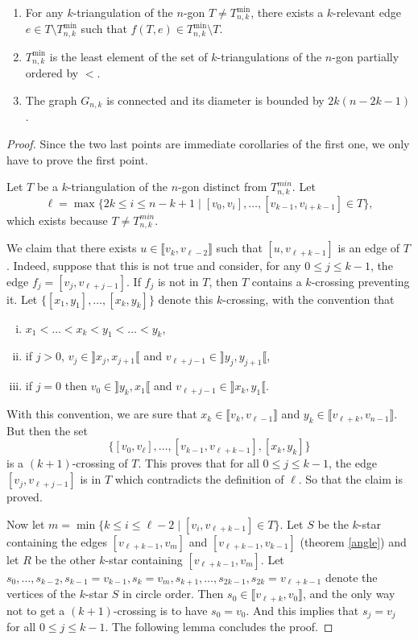 \documentclass[12pt]{amsart}
\begin{document}
\begin{proposition}\label{connexity}
\begin{enumerate}
\item For any $k$-triangulation of the $n$-gon $T\ne T_{n,k}^{\min}$, there exists a $k$-relevant edge $e\in T\setminus T_{n,k}^{\min}$ such that $f(T,e)\in T_{n,k}^{\min}\setminus T$.
\item $T_{n,k}^{\min}$ is the least element of the set of $k$-triangulations of the $n$-gon partially ordered by $<$.
\item The graph $G_{n,k}$ is connected and its diameter is bounded by $2k(n-2k-1)$.
\end{enumerate}
\end{proposition}

\begin{proof}
Since the two last points are immediate corollaries of the first one, we only have to prove the first point.

Let $T$ be a $k$-triangulation of the $n$-gon distinct from $T_{n,k}^{min}$. Let
$$\ell=\max\{2k\le i\le n-k+1\;|\;[v_0,v_i],\ldots,[v_{k-1},v_{i+k-1}]\in T\},$$
which exists because $T\ne T_{n,k}^{min}$.

We claim that there exists $u\in\llbracket v_k, v_{\ell-2}\rrbracket$ such that $[u,v_{\ell+k-1}]$ is an edge of $T$. Indeed, suppose that this is not true and consider, for any $0\le j\le k-1$, the edge $f_j=[v_j,v_{\ell+j-1}]$. If $f_j$ is not in $T$, then $T$ contains a $k$-crossing preventing it.
Let $\{[x_1,y_1],\ldots,[x_k,y_k]\}$ denote this $k$-crossing, with the convention that
\begin{enumerate}[(i)]
\item $x_1<\ldots<x_k<y_1<\ldots<y_k$,
\item if $j>0$, $v_j\in\rrbracket x_j,x_{j+1}\llbracket$ and $v_{\ell+j-1}\in\rrbracket y_j,y_{j+1}\llbracket$,
\item if $j=0$ then $v_0\in\rrbracket y_k,x_1\llbracket$ and $v_{\ell+j-1}\in\rrbracket x_k,y_1\llbracket$.
\end{enumerate}
With this convention, we are sure that $x_k\in\llbracket v_k,v_{\ell-1}\rrbracket$ and $y_k\in\llbracket v_{\ell+k},v_{n-1}\rrbracket$. But then the set
$$\{[v_0,v_\ell],\ldots,[v_{k-1},v_{\ell+k-1}],[x_k,y_k]\}$$
is a $(k+1)$-crossing of $T$. This proves that for all $0\le j\le k-1$, the edge $[v_j,v_{\ell+j-1}]$ is in $T$ which contradicts the definition of $\ell$. So that the claim is proved.

Now let $m=\min\{k\le i\le \ell-2\;|\; [v_i,v_{\ell+k-1}]\in T\}$. Let $S$ be the $k$-star containing the edges $[v_{\ell+k-1},v_m]$ and $[v_{\ell+k-1},v_{k-1}]$ (theorem \ref{angle}) and let $R$ be the other $k$-star containing $[v_{\ell+k-1},v_m]$. Let $s_0, \ldots,s_{k-2},s_{k-1}=v_{k-1},s_k=v_m,s_{k+1},\ldots,s_{2k-1},s_{2k}=v_{\ell+k-1}$ denote the vertices of the $k$-star $S$ in circle order. Then $s_0\in\llbracket v_{\ell+k}, v_0\rrbracket$, and the only way not to get a $(k+1)$-crossing is to have $s_0=v_0$. And this implies that $s_j=v_j$ for all $0\le j\le k-1$. The following lemma concludes the proof.
\end{proof}
\end{document}
